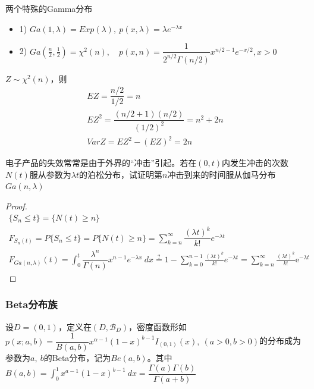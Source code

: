 两个\textcolor{main1}{特殊的Gamma分布}
\begin{itemize}
    \item 1) $Ga(1, \lambda) = Exp(\lambda),\ p(x,\lambda) =\lambda e^{-\lambda x}$
    \item 2) $Ga(\frac{n}{2},\frac{1}{2})=\chi^2(n),\quad p(x,n)=\dfrac{1}{2^{n/2}\Gamma(n/2)}x^{n/2-1}e^{-x/2},x>0$
\end{itemize}
\begin{note}
    $Z \sim \chi^2(n)$，则
    \[
        \begin{array}{l}
            EZ = \dfrac{n/2}{1/2} = n\\
            EZ^2 = \dfrac{(n/2+1)(n/2)}{(1/2)^2}=n^2+2n \\
            VarZ = EZ^2-(EZ)^2 = 2n
        \end{array}   
    \]
\end{note}
\begin{example}
    电子产品的失效常常是由于外界的“冲击”引起。若在$(0,t)$内发生冲击的次数$N(t)$服从参数为$\lambda t$的泊松分布，试证明第$n$冲击到来的时间服从伽马分布$Ga(n,\lambda)$
\end{example}
\begin{proof}
    \[
        \begin{array}{c}
            \{ S_n\leqslant t\} = \{ N(t)\geqslant n\}\\
            F_{S_{n}(t)} = P\{S_n\leqslant t\} = P\{ N(t)\geqslant n\} = \sum\limits_{k =n}^{\infty}\dfrac{(\lambda t)^{k}}{k!}e^{-\lambda t}\\
            F_{Ga(n,\lambda)}(t) = \displaystyle\int_{0}^{t}\dfrac{\lambda^n}{\Gamma(n)}x^{n-1}e^{-\lambda x}\ dx \overset{?}{=} 1-\sum_{k=0}^{n-1}\frac{(\lambda t)^{k}}{k!}e^{-\lambda t}=\sum_{k=n}^{\infty}\frac{(\lambda t)^{k}}{k!}\mathrm{e}^{-\lambda t}
        \end{array}
    \]
\end{proof}

\subsubsection{Beta分布族}
\begin{definition}[Beta分布]
    设$D=(0,1)$，定义在$(D,\mathscr{B}_D)$，密度函数形如$p(x;a,b) = \dfrac{1}{B(a,b)}x^{\alpha-1}(1-x)^{b-1}I_{(0,1)}(x),\ (a>0, b>0)$的分布成为参数为$a,\ b$的Beta分布，记为$Be(a,b)$。其中$B(a,b) = \displaystyle \int_{0}^{1}x^{a-1}(1-x)^{b-1}\ dx = \dfrac{\Gamma(a)\Gamma(b)}{\Gamma(a+b)}$    
\end{definition}

